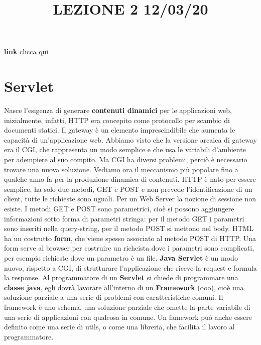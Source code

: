 \title{LEZIONE 2 12/03/20}\newline
\textbf{link} \href{https://web.microsoftstream.com/video/58568b1d-5fc5-41c0-88f6-608e4b8f9f7a}{clicca qui}
\section{Servlet}
Nasce l'esigenza di generare \textbf{contenuti dinamici} per le applicazioni web, inizialmente, infatti, HTTP era concepito come protocollo per scambio di documenti statici.\newline
\newline
Il gateway è un elemento imprescindibile che aumenta le capacità di un'applicazione web. Abbiamo visto che la versione arcaica di gateway era il CGI, che rappresenta un modo semplice e che usa le variabili d'ambiente per adempiere al suo compito. Ma CGI ha diversi problemi, perciò è necessario trovare una nuova soluzione.\newline
\newline
Vediamo ora il meccanismo più popolare fino a qualche anno fa per la produzione dinamica di contenuti.\newline
\newline
HTTP è nato per essere semplice, ha solo due metodi, GET e POST e non prevede l'identificazione di un client, tutte le richieste sono uguali.\newline
\newline
Per un Web Server la nozione di sessione non esiste.\newline
\newline
I metodi GET e POST sono parametrici, cioè si possono aggiungere informazioni sotto forma di parametri stringa: per il metodo GET i parametri sono inseriti nella query-string, per il metodo POST si mettono nel body.\newline
HTML ha un costrutto \textbf{form}, che viene spesso associato al metodo POST di HTTP. Una form serve al browser per costruire un richeista dove i parametri sono complicati, per esempio richieste dove un parametro è un file.\newline
\newline
\textbf{Java Servlet} è un modo nuovo, rispetto a CGI, di strutturare l'applicazione che riceve la request e formula la response.\newline
\newline
Al programmatore di un \textbf{Servlet} si chiede di programmare una \textbf{classe java}, egli dovrà lavorare all'interno di un \textbf{Framework} (ooo), cioè una soluzione parziale a una serie di problemi con caratteristiche comuni. Il framework è uno schema, una soluzione parziale che omette la parte variabile di una serie di applicazioni con qualcosa in comune. Un famework può anche essere definito come una serie di utils, o come una libreria, che facilita il lavoro al programmatore.\newline
